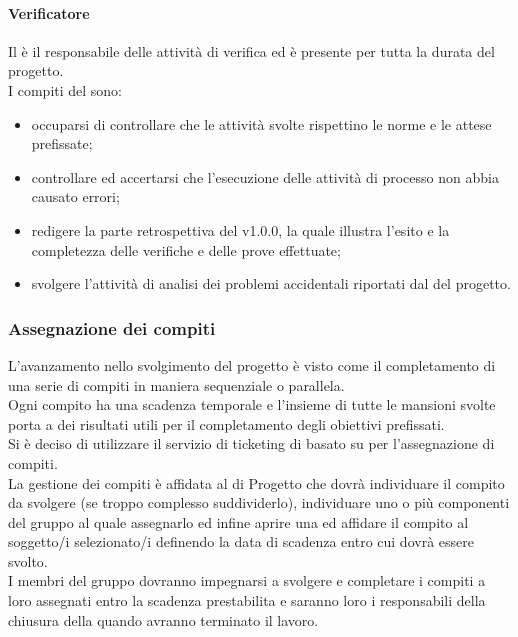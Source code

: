             \paragraph{Verificatore  }
                Il  è il responsabile delle attività di verifica ed è presente per tutta la durata del progetto. \\
                I compiti del  sono:\\
                \begin{itemize}
                    \item occuparsi di controllare che le attività svolte rispettino le norme e le attese prefissate;
                    \item controllare ed accertarsi che l’esecuzione delle attività di processo non abbia causato errori;
                    \item redigere la parte retrospettiva del  v1.0.0, la quale illustra l’esito e la completezza delle verifiche e delle prove effettuate;
                    \item svolgere l’attività di analisi dei problemi accidentali riportati dal  del progetto.
                \end{itemize}
        \subsubsection{Assegnazione dei compiti}
            L’avanzamento nello svolgimento del progetto è visto come il completamento di una serie di compiti in maniera sequenziale o parallela. \\
            Ogni compito ha una scadenza temporale e l’insieme di tutte le mansioni svolte porta a dei risultati utili per il completamento degli obiettivi prefissati.\\
            Si è deciso di utilizzare il servizio di ticketing di  basato su  per l’assegnazione di compiti.\\
            La gestione dei compiti è affidata al  di Progetto che dovrà individuare il compito da svolgere (se troppo complesso suddividerlo), individuare uno o più componenti del gruppo al quale assegnarlo ed infine aprire una  ed affidare il compito al soggetto/i selezionato/i definendo la data di scadenza entro cui dovrà essere svolto.\\
            I membri del gruppo dovranno impegnarsi a svolgere e completare i compiti a loro assegnati entro la scadenza prestabilita e saranno loro i responsabili della chiusura della  quando avranno terminato il lavoro.\\
